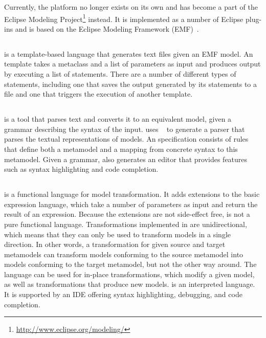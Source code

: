 Currently, the platform no longer exists on its own and has become a part of the Eclipse Modeling Project\footnote{\url{http://www.eclipse.org/modeling/}} instead.
It is implemented as a number of Eclipse plug-ins and is based on the Eclipse Modeling Framework (EMF)~\cite{Steinberg2008}.

\subsection{\Xpand}

\Xpand is a template-based language that generates text files given an EMF model.
An \Xpand template takes a metaclass and a list of parameters as input and produces output by executing a list of statements.
There are a number of different types of statements, including one that saves the output generated by its statements to a file and one that triggers the execution of another template.

\subsection{\Xtext}
\Xtext is a tool that parses text and converts it to an equivalent model, given a grammar describing the syntax of the input.
\Xtext uses \ANTLR~\cite{ANTLR-LLK} to generate a parser that parses the textual representations of models.
An \Xtext specification consists of rules that define both a metamodel and a mapping from concrete syntax to this metamodel.
Given a grammar, \Xtext also generates an editor that provides features such as syntax highlighting and code completion.

\subsection{\Xtend}
\Xtend is a functional language for model transformation.
It adds extensions to the basic expression language, which take a number of parameters as input and return the result of an expression.
Because the extensions are not side-effect free, \Xtend is not a pure functional language.
Transformations implemented in \Xtend are unidirectional, which means that they can only be used to transform models in a single direction.
In other words, a transformation for given source and target metamodels can transform models conforming to the source metamodel into models conforming to the target metamodel, but not the other way around.
The language can be used for in-place transformations, which modify a given model, as well as transformations that produce new models.
\Xtend is an interpreted language.
It is supported by an IDE offering syntax highlighting, debugging, and code completion.

